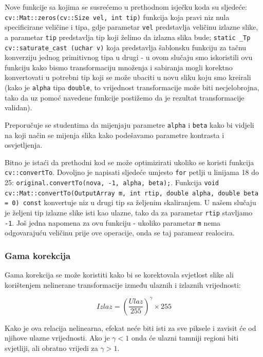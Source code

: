 \documentclass[a4paper, 12pt]{article}
\begin{document}
Nove funkcije sa kojima se susrećemo u prethodnom isječku koda su sljedeće: \newline \lstinline{cv::Mat::zeros(cv::Size vel, int tip)} funkcija koja pravi niz nula specificirane veličine i tipa, gdje parametar \lstinline{vel} predstavlja veličinu izlazne slike, a parametar \lstinline{tip} predstavlja tip koji želimo da izlazna slika bude; \lstinline{static _Tp cv::saturate_cast (uchar v)} koja predstavlja šablonsku funkciju za tačnu konverziju jednog primitivnog tipa u drugi - u ovom slučaju smo iskoristili ovu funkciju kako bismo transformaciju množenja i sabiranja mogli korektno konvertovati u potrebni tip koji se može ubaciti u novu sliku koju smo kreirali (kako je \lstinline{alpha} tipa \lstinline{double}, to vrijednost transformacije može biti necjelobrojna, tako da uz pomoć navedene funkcije postižemo da je rezultat transformacije validan). 

Preporučuje se studentima da mijenjaju parametre \lstinline{alpha} i \lstinline{beta} kako bi vidjeli na koji način se mijenja slika kako podešavamo parametre kontrasta i osvjetljenja.

Bitno je istaći da prethodni kod se može optimizirati ukoliko se koristi funkcija \lstinline{cv::convertTo}. Dovoljno je napisati sljedeće umjesto \lstinline{for} petlji u linijama 18 do 25: \lstinline{original.convertTo(nova, -1, alpha, beta);}. Funkcija \lstinline{void cv::Mat::convertTo(OutputArray m, int rtip, double alpha, double beta = 0) const} konvertuje niz u drugi tip sa željenim skaliranjem. U našem slučaju je željeni tip izlazne slike isti kao ulazne, tako da za parametar \lstinline{rtip} stavljamo \lstinline{-1}. Još jedna napomena za ovu funkciju - ukoliko parametar \lstinline{m} nema odgovarajuću veličinu prije ove operacije, onda se taj paramear realocira.

\subsubsection*{Gama korekcija}

Gama korekcija se može koristiti kako bi se korektovala svjetlost slike ali korištenjem nelinerane transformacije između ulaznih i izlaznih vrijednosti:

\begin{equation*}
    Izlaz = { \left( \frac{Ulaz}{255} \right) }^{\gamma} \times 255
\end{equation*}

Kako je ova relacija nelinearna, efekat neće biti isti za sve piksele i zavisit će od njihove ulazne vrijednosti. Ako je $\gamma < 1$ onda će ulazni tamniji regioni biti svjetliji, ali obratno vrijedi za $\gamma > 1$.
\end{document}
